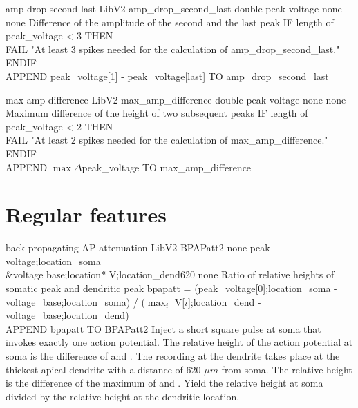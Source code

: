 \begin{efeature}
  {amp drop second last}
  {LibV2}
  {amp\_drop\_second\_last}
  {double}
  {peak voltage}
  {none}
  {none}
  {Difference of the amplitude of the second and the last peak}
  {
  IF length of peak\_voltage < 3 THEN \+ \\
    FAIL "At least 3 spikes needed for the calculation of amp\_drop\_second\_last." \- \\
  ENDIF \\
  APPEND peak\_voltage[1] - peak\_voltage[last] TO amp\_drop\_second\_last
  }
  
\end{efeature}

\begin{efeature}
  {max amp difference}
  {LibV2}
  {max\_amp\_difference}
  {double}
  {peak voltage}
  {none}
  {none}
  {Maximum difference of the height of two subsequent peaks}
  {
  IF length of peak\_voltage < 2 THEN \+ \\
    FAIL "At least 2 spikes needed for the calculation of max\_amp\_difference." \- \\
  ENDIF \\
  APPEND $\max \Delta$peak\_voltage TO max\_amp\_difference
  }
  
\end{efeature}
\section{Regular features}


\begin{efeature}
  {back-propagating AP attenuation}
  {LibV2}
  {BPAPatt2}
  {none}
  {peak voltage;location\_soma\\&voltage base;location*}
  {V;location\_dend620}
  {none}
  {Ratio of relative heights of somatic peak and dendritic peak}
  {
  bpapatt = (peak\_voltage[0];location\_soma - voltage\_base;location\_soma) / ($\max_i$ V[$i$];location\_dend - voltage\_base;location\_dend) \\
  APPEND bpapatt TO BPAPatt2
  }
  Inject a short square pulse at soma that invokes exactly one action potential.
  The relative height of the action potential at soma is the difference of  and .
  The recording at the dendrite takes place at the thickest apical dendrite with a distance of 620 $\mu m$ from soma.
  The relative height is the difference of the maximum of  and .
  Yield the relative height at soma divided by the relative height at the dendritic location.
  
\end{efeature}


